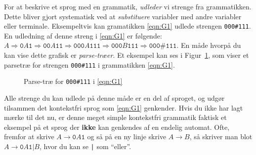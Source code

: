 For at beskrive et sprog med en grammatik, \textit{udleder} vi strenge fra grammatikken. Dette bliver gjort systematisk ved at \textit{substituere} variabler med andre variabler eller terminale. Eksempeltvis kan gramatikken \ref{eqn:G1} udlede strengen \texttt{000\#111}. En udledning af denne streng i \ref{eqn:G1} er følgende: $A \Rightarrow \mathtt{0}A \mathtt{1} \Rightarrow \mathtt{00}A \mathtt{11} \Rightarrow \mathtt{000}A \mathtt{111} \Rightarrow \mathtt{000}B \mathtt{111} \Rightarrow \mathtt{000\#111}$. En måde hvorpå du kan vise dette grafisk er \textit{parse-træer}. Et eksempel kan ses i Figur~\ref{fig:parsetreeg1}, som viser et parsetræ for strengen \texttt{000\#111} i grammatikken \ref{eqn:G1}.

\begin{figure}[ht]
  \centering
{}
  \caption{\label{fig:parsetreeg1} Parse-træ for \texttt{000\#111} i \ref{eqn:G1}}
\end{figure}


Alle strenge du kan udlede på denne måde er en del af sproget, og udgør tilsammen det kontekstfri sprog som \ref{eqn:G1} genkender. Hvis du ikke har lagt mærke til det nu, er denne meget simple kontekstfri grammatik faktisk et eksempel på et sprog der \textbf{ikke} kan genkendes af en endelig automat. Ofte, fremfor at skrive $A \rightarrow \mathtt{0}A \mathtt{1}$ og så på en ny linje skrive $A \rightarrow B$, så skriver man blot $A \rightarrow \mathtt{0} A \mathtt{1} | B$, hvor du kan se \texttt{|} som ``eller''.

